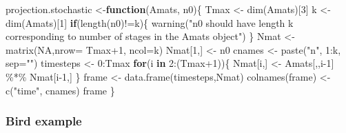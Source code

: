 \documentclass[
]{book}
\newenvironment{Shaded}{\begin{snugshade}}{\end{snugshade}}
\newcommand{\AttributeTok}[1]{\textcolor[rgb]{0.77,0.63,0.00}{#1}}
\newcommand{\ConstantTok}[1]{\textcolor[rgb]{0.00,0.00,0.00}{#1}}
\newcommand{\ControlFlowTok}[1]{\textcolor[rgb]{0.13,0.29,0.53}{\textbf{#1}}}
\newcommand{\DecValTok}[1]{\textcolor[rgb]{0.00,0.00,0.81}{#1}}
\newcommand{\FunctionTok}[1]{\textcolor[rgb]{0.00,0.00,0.00}{#1}}
\newcommand{\NormalTok}[1]{#1}
\newcommand{\OtherTok}[1]{\textcolor[rgb]{0.56,0.35,0.01}{#1}}
\newcommand{\SpecialCharTok}[1]{\textcolor[rgb]{0.00,0.00,0.00}{#1}}
\newcommand{\StringTok}[1]{\textcolor[rgb]{0.31,0.60,0.02}{#1}}
\begin{document}
\begin{Shaded}
\begin{Highlighting}[]
\NormalTok{projection.stochastic }\OtherTok{\textless{}{-}}\ControlFlowTok{function}\NormalTok{(Amats, n0)\{}
\NormalTok{    Tmax }\OtherTok{\textless{}{-}} \FunctionTok{dim}\NormalTok{(Amats)[}\DecValTok{3}\NormalTok{]}
\NormalTok{    k }\OtherTok{\textless{}{-}} \FunctionTok{dim}\NormalTok{(Amats)[}\DecValTok{1}\NormalTok{]}
    \ControlFlowTok{if}\NormalTok{(}\FunctionTok{length}\NormalTok{(n0)}\SpecialCharTok{!=}\NormalTok{k)\{}
      \FunctionTok{warning}\NormalTok{(}\StringTok{"n0 should have length k }
\StringTok{              corresponding to number of }
\StringTok{              stages in the Amats object"}\NormalTok{)}
\NormalTok{      \}}
\NormalTok{    Nmat }\OtherTok{\textless{}{-}} \FunctionTok{matrix}\NormalTok{(}\ConstantTok{NA}\NormalTok{,}\AttributeTok{nrow=}\NormalTok{ Tmax}\SpecialCharTok{+}\DecValTok{1}\NormalTok{, }\AttributeTok{ncol=}\NormalTok{k)}
\NormalTok{    Nmat[}\DecValTok{1}\NormalTok{,] }\OtherTok{\textless{}{-}}\NormalTok{ n0}
\NormalTok{  cnames }\OtherTok{\textless{}{-}} \FunctionTok{paste}\NormalTok{(}\StringTok{"n"}\NormalTok{, }\DecValTok{1}\SpecialCharTok{:}\NormalTok{k, }\AttributeTok{sep=}\StringTok{""}\NormalTok{)}
\NormalTok{  timesteps }\OtherTok{\textless{}{-}} \DecValTok{0}\SpecialCharTok{:}\NormalTok{Tmax}
    \ControlFlowTok{for}\NormalTok{(i }\ControlFlowTok{in} \DecValTok{2}\SpecialCharTok{:}\NormalTok{(Tmax}\SpecialCharTok{+}\DecValTok{1}\NormalTok{))\{  }
\NormalTok{        Nmat[i,] }\OtherTok{\textless{}{-}}\NormalTok{ Amats[,,i}\DecValTok{{-}1}\NormalTok{] }\SpecialCharTok{\%*\%}\NormalTok{ Nmat[i}\DecValTok{{-}1}\NormalTok{,]}
\NormalTok{        \}}
\NormalTok{  frame }\OtherTok{\textless{}{-}} \FunctionTok{data.frame}\NormalTok{(timesteps,Nmat)}
  \FunctionTok{colnames}\NormalTok{(frame) }\OtherTok{\textless{}{-}} \FunctionTok{c}\NormalTok{(}\StringTok{"time"}\NormalTok{, cnames)}
\NormalTok{  frame}
\NormalTok{\}}
\end{Highlighting}
\end{Shaded}

\hypertarget{bird-example-17}{%
\subsubsection*{Bird example}\label{bird-example-17}}
\end{document}
